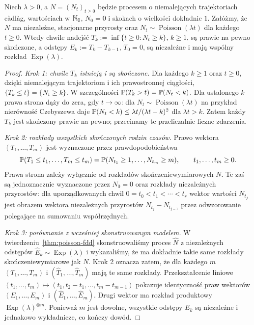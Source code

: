 \begin{twierdzenie}
\label{thm:poisson-reverse}
Niech $\lambda>0$, a $N=(N_t)_{t\ge0}$ będzie procesem
o niemalejących trajektoriach c\`adl\`ag, wartościach
w $\mathbb{N}_0$, $N_0=0$ i skokach o wielkości dokładnie $1$.
Załóżmy, że $N$ ma niezależne, stacjonarne przyrosty
oraz $N_t\sim\operatorname{Poisson}(\lambda t)$ dla każdego
$t\ge0$. Wtedy chwile nadejść
$T_k:=\inf\{t\ge0:N_t\ge k\}$, $k\ge1$,
są prawie na pewno skończone, a odstępy
$E_k:=T_k-T_{k-1}$, $T_0=0$, są niezależne i mają
wspólny rozkład $\operatorname{Exp}(\lambda)$.
\end{twierdzenie}
\begin{proof}
\emph{Krok 1: chwile $T_k$ istnieją i są skończone.}
Dla każdego $k\ge1$ oraz $t\ge0$, dzięki niemalejącym
trajektoriom i ich prawostronnej ciągłości,
$\{T_k\le t\}=\{N_t\ge k\}$.
W szczególności $\mathbb{P}(T_k>t)=\mathbb{P}(N_t<k)$.
Dla ustalonego $k$ prawa strona dąży do zera, gdy
$t\to\infty$: dla $N_t\sim\operatorname{Poisson}(\lambda t)$
na przykład nierówność Czebyszewa daje
$\mathbb{P}(N_t<k)\le\lambda t/(\lambda t-k)^2$
dla $\lambda t>k$.
Zatem każdy $T_k$ jest skończony prawie na pewno;
przecinamy te przeliczalnie liczne zdarzenia.

\emph{Krok 2: rozkłady wszystkich skończonych rodzin czasów.}
Prawo wektora $(T_1,\ldots,T_m)$ jest wyznaczone
przez prawdopodobieństwa
\[
\mathbb{P}(T_1\le t_1,\ldots,T_m\le t_m)
=\mathbb{P}(N_{t_1}\ge1,\ldots,N_{t_m}\ge m),
\qquad t_1,\ldots,t_m\ge0.
\]
Prawa strona zależy wyłącznie od rozkładów
skończeniewymiarowych $N$. Te zaś są jednoznacznie
wyznaczone przez $N_0=0$ oraz rozkłady niezależnych
przyrostów: dla uporządkowanych chwil $0=t_0<t_1<\cdots<t_r$
wektor wartości $N_{t_j}$ jest obrazem wektora
niezależnych przyrostów $N_{t_j}-N_{t_{j-1}}$ przez
odwzorowanie polegające na sumowaniu współrzędnych.

\emph{Krok 3: porównanie z wcześniej skonstruowanym modelem.}
W twierdzeniu~\ref{thm:poisson-fdd} skonstruowaliśmy
proces $\widehat N$ z niezależnych odstępów
$\widehat E_k\sim\operatorname{Exp}(\lambda)$ i wykazaliśmy,
że ma dokładnie takie same rozkłady skończeniewymiarowe jak $N$.
Krok 2 oznacza zatem, że dla każdego $m$
$(T_1,\ldots,T_m)$ i $(\widehat T_1,\ldots,\widehat T_m)$
mają te same rozkłady. Przekształcenie liniowe
$(t_1,\ldots,t_m)\mapsto(t_1,t_2-t_1,\ldots,t_m-t_{m-1})$
pokazuje identyczność praw wektorów
$(E_1,\ldots,E_m)$ i $(\widehat E_1,\ldots,\widehat E_m)$.
Drugi wektor ma rozkład produktowy
$\operatorname{Exp}(\lambda)^{\otimes m}$.
Ponieważ $m$ jest dowolne, wszystkie odstępy $E_k$
są niezależne i jednakowo wykładnicze, co kończy dowód.
\end{proof}

